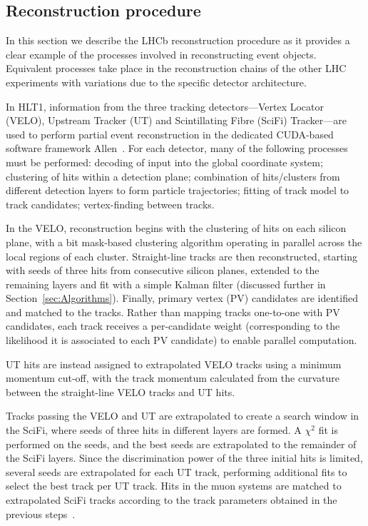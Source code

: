 \subsection{Reconstruction procedure}

In this section we describe the LHCb reconstruction procedure as it provides a clear example of the processes involved in reconstructing event objects. Equivalent processes take place in the reconstruction chains of the other LHC experiments with variations due to the specific detector architecture.

In HLT1, information from the three tracking detectors—Vertex Locator (VELO), Upstream Tracker (UT) and Scintillating Fibre (SciFi) Tracker—are used to perform partial event reconstruction in the dedicated CUDA-based software framework Allen~\cite{LHCb_Allen_GPU}. For each detector, many of the following processes must be performed: decoding of input into the global coordinate system; clustering of hits within a detection plane; combination of hits/clusters from different detection layers to form particle trajectories; fitting of track model to track candidates; vertex-finding between tracks.

In the VELO, reconstruction begins with the clustering of hits on each silicon plane, with a bit mask-based clustering algorithm operating in parallel across the local regions of each cluster. Straight-line tracks are then reconstructed, starting with seeds of three hits from consecutive silicon planes, extended to the remaining layers and fit with a simple Kalman filter (discussed further in Section~\ref{sec:Algorithms}). Finally, primary vertex (PV) candidates are identified and matched to the tracks. Rather than mapping tracks one-to-one with PV candidates, each track receives a per-candidate weight (corresponding to the likelihood it is associated to each PV candidate) to enable parallel computation. 

UT hits are instead assigned to extrapolated VELO tracks using a minimum momentum cut-off, with the track momentum calculated from the curvature between the straight-line VELO tracks and UT hits.

Tracks passing the VELO and UT are extrapolated to create a search window in the SciFi, where seeds of three hits in different layers are formed. A $\chi^2$ fit is performed on the seeds, and the best seeds are extrapolated to the remainder of the SciFi layers. Since the discrimination power of the three initial hits is limited, several seeds are extrapolated for each UT track, performing additional fits to select the best track per UT track. Hits in the muon systems are matched to extrapolated SciFi tracks according to the track parameters obtained in the previous steps~\cite{LHCb:2023hlw, LHCb_Allen_GPU}.